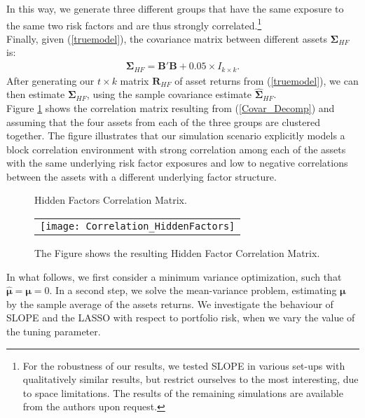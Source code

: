 \documentclass[12pt, a4paper]{article}
\newcommand{\bfmu}{\boldsymbol{\mu} }
\begin{document}
\noindent
In this way, we generate three different groups that have the same exposure to the same two risk factors and are thus strongly correlated.\footnote{For the robustness of our results, we tested SLOPE in various set-ups with qualitatively similar results, but restrict ourselves to the most interesting, due to space limitations. The results of the remaining simulations are available from the authors upon request.}\\
Finally, given (\ref{truemodel}), the covariance matrix between different assets $\boldsymbol{\Sigma}_{HF}$ is:
%
\begin{gather}\label{Covar_Decomp}
\boldsymbol{\Sigma}_{HF} = \boldsymbol{B}' \boldsymbol{B} + 0.05\times I_{k\times k}.
\end{gather}
%
After generating our $t \times k$ matrix $\boldsymbol{R}_{HF}$ of asset returns from (\ref{truemodel}), we can then estimate $\boldsymbol{\Sigma}_{HF}$, using the sample covariance estimate $\boldsymbol{\hat{\Sigma}}_{HF}$.\\
Figure \ref{Correl_HF} shows the correlation matrix resulting from (\ref{Covar_Decomp}) and assuming that the four assets from each of the three groups are clustered together. 
The figure illustrates that our simulation scenario explicitly models a block correlation environment with strong correlation among each of the assets with the same underlying risk factor exposures and low to negative correlations between the assets with a different underlying factor structure.
%
\begin{figure}
\centering
\caption{Hidden Factors Correlation Matrix.}\label{Correl_HF}
\begin{tabular}{c}
\texttt{[image: Correlation\_HiddenFactors]}
\end{tabular}
\captionsetup{font=scriptsize,labelfont=scriptsize, width=\textwidth}
     \caption*{The Figure shows the resulting Hidden Factor Correlation Matrix.}
\end{figure}
%
In what follows, we first consider a minimum variance optimization, such that $\hat{\bfmu}=\bfmu= 0$. In a second step, we solve the mean-variance problem, estimating $\bfmu$ 
by the sample average of the assets returns.
We investigate the behaviour of SLOPE and the LASSO with respect to portfolio risk, when we vary the value of the tuning parameter.\\
\end{document}
